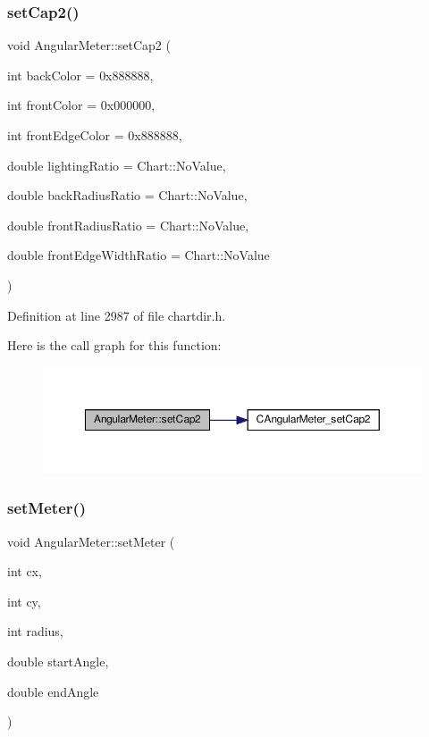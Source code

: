 \subsubsection{\texorpdfstring{set\+Cap2()}{setCap2()}}
{\footnotesize\ttfamily void Angular\+Meter\+::set\+Cap2 (\begin{DoxyParamCaption}\item[{int}]{back\+Color = {\ttfamily 0x888888},  }\item[{int}]{front\+Color = {\ttfamily 0x000000},  }\item[{int}]{front\+Edge\+Color = {\ttfamily 0x888888},  }\item[{double}]{lighting\+Ratio = {\ttfamily Chart\+:\+:NoValue},  }\item[{double}]{back\+Radius\+Ratio = {\ttfamily Chart\+:\+:NoValue},  }\item[{double}]{front\+Radius\+Ratio = {\ttfamily Chart\+:\+:NoValue},  }\item[{double}]{front\+Edge\+Width\+Ratio = {\ttfamily Chart\+:\+:NoValue} }\end{DoxyParamCaption})\hspace{0.3cm}{\ttfamily [inline]}}



Definition at line 2987 of file chartdir.\+h.

Here is the call graph for this function\+:
\nopagebreak
\begin{figure}[H]
\begin{center}
\leavevmode
\includegraphics[width=350pt]{class_angular_meter_a80b2f6a0dea2b4968ef7cca433e85a1d_cgraph}
\end{center}
\end{figure}
\mbox{\label{class_angular_meter_a569e2ac4b396f2c1cafb5943f390c454}} 
\subsubsection{\texorpdfstring{set\+Meter()}{setMeter()}}
{\footnotesize\ttfamily void Angular\+Meter\+::set\+Meter (\begin{DoxyParamCaption}\item[{int}]{cx,  }\item[{int}]{cy,  }\item[{int}]{radius,  }\item[{double}]{start\+Angle,  }\item[{double}]{end\+Angle }\end{DoxyParamCaption})\hspace{0.3cm}{\ttfamily [inline]}}



